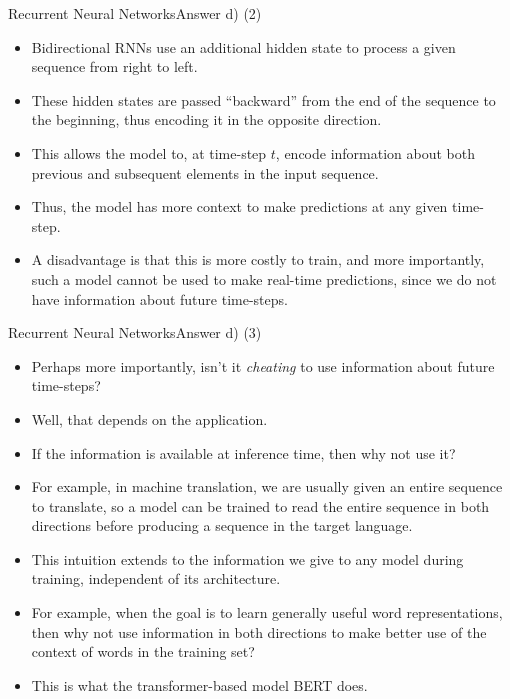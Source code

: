 \documentclass[t]{beamer}
\begin{document}
\begin{frame}{Recurrent Neural Networks}{Answer d) (2)}
    \begin{itemize}
        \item Bidirectional RNNs use an additional hidden state to process a
              given sequence from right to left.
        \item These hidden states are passed ``backward'' from the end of the
              sequence to the beginning, thus encoding it in the opposite
              direction.
        \item This allows the model to, at time-step $t$, encode information
              about both previous and subsequent elements in the input sequence.
        \item Thus, the model has more context to make predictions at any given
              time-step.
        \item A disadvantage is that this is more costly to train, and more
              importantly, such a model cannot be used to make real-time
              predictions, since we do not have information about future
              time-steps.
    \end{itemize}
\end{frame}

\begin{frame}{Recurrent Neural Networks}{Answer d) (3)}
    \begin{itemize}
        \item Perhaps more importantly, isn't it \emph{cheating} to use
              information about future time-steps?
        \item Well, that depends on the application.
        \item If the information is available at inference time, then why not
              use it?
        \item For example, in machine translation, we are usually given an
              entire sequence to translate, so a model can be trained to read
              the entire sequence in both directions before producing a sequence
              in the target language.
        \item This intuition extends to the information we give to any model
              during training, independent of its architecture.
        \item For example, when the goal is to learn generally useful word
              representations, then why not use information in both directions
              to make better use of the context of words in the training set?
        \item This is what the transformer-based model BERT does.
    \end{itemize}
\end{frame}
\end{document}
